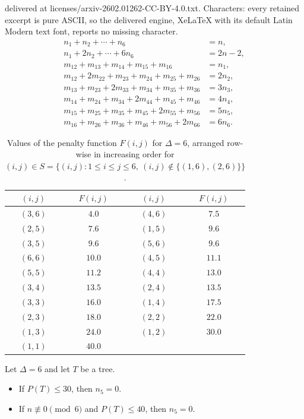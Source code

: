 \documentclass[10pt,a4paper]{amsart}
\begin{document}
delivered at licenses/arxiv-2602.01262-CC-BY-4.0.txt. Characters: every retained excerpt is pure ASCII, so the delivered engine, XeLaTeX with its default Latin Modern text font, reports no missing character.
\begin{align}
n_1+n_2+\cdots+n_6&=n, \label{eq:tree-sum-ni}\\
n_1+2n_2+\cdots+6n_6&=2n-2, \label{eq:tree-sum-deg}\\
m_{12}+m_{13}+m_{14}+m_{15}+m_{16}&=n_1, \label{eq:tree-ni-1}\\
m_{12}+2m_{22}+m_{23}+m_{24}+m_{25}+m_{26}&=2n_2, \label{eq:tree-ni-2}\\
m_{13}+m_{23}+2m_{33}+m_{34}+m_{35}+m_{36}&=3n_3, \label{eq:tree-ni-3}\\
m_{14}+m_{24}+m_{34}+2m_{44}+m_{45}+m_{46}&=4n_4, \label{eq:tree-ni-4}\\
m_{15}+m_{25}+m_{35}+m_{45}+2m_{55}+m_{56}&=5n_5, \label{eq:tree-ni-5}\\
m_{16}+m_{26}+m_{36}+m_{46}+m_{56}+2m_{66}&=6n_6. \label{eq:tree-ni-6}
\end{align}

\begin{table}[ht]
\centering
\caption{Values of the penalty function $F(i,j)$ for $\Delta=6$, arranged row-wise
in increasing order for $(i,j)\in S=\{(i,j):1\le i\le j\le 6,\ (i,j)\notin\{(1,6),(2,6)\}\}$.}
\label{tab:F-delta6-row}
\begin{tabular}{cccc}
\hline
$(i,j)$ & $F(i,j)$ & $(i,j)$ & $F(i,j)$ \\ \hline
$(3,6)$ & $4.0$   & $(4,6)$ & $7.5$   \\
$(2,5)$ & $7.6$   & $(1,5)$ & $9.6$   \\
$(3,5)$ & $9.6$   & $(5,6)$ & $9.6$   \\
$(6,6)$ & $10.0$  & $(4,5)$ & $11.1$  \\
$(5,5)$ & $11.2$  & $(4,4)$ & $13.0$  \\
$(3,4)$ & $13.5$  & $(2,4)$ & $13.5$  \\
$(3,3)$ & $16.0$  & $(1,4)$ & $17.5$  \\
$(2,3)$ & $18.0$  & $(2,2)$ & $22.0$  \\
$(1,3)$ & $24.0$  & $(1,2)$ & $30.0$  \\
$(1,1)$ & $40.0$  &         &         \\ \hline
\end{tabular}
\end{table}

\begin{lemma}
\label{lem:no5-threshold}
Let $\Delta=6$ and let $T$ be a tree.
\begin{itemize}
\item If $P(T)\le 30$, then $n_5=0$.
\item If $n\not\equiv 0\pmod 6$ and $P(T)\le 40$, then $n_5=0$.
\end{itemize}
\end{lemma}
\end{document}
